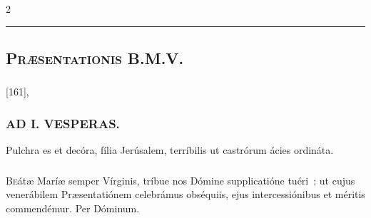 \documentclass[9pt,twoside]{extarticle}
\begin{document}
\begin{multicols}{2}
\begin{center}\textcolor{red}{\rule{\linewidth}{0.5pt}} \end{center}

\subsection*{\center \textsc{}}
\subsubsection*{\center {}}
\subsection*{\center \textsc{Præsentationis B.M.V.}}
\subsubsection*{\center {}}
\begin{tightlist}{}
\item {} [161], 
\end{tightlist}
\subsubsection*{\center \textsc{AD I. VESPERAS.}}
\begin{tightlist}{}
\item {} Pulchra es et decóra, fília Jerúsalem, terríbilis ut castrórum ácies ordináta. 
\end{tightlist}
\subsubsection*{\center {}}
\lettrine{B}eátæ Maríæ semper Vírginis, tríbue nos Dómine supplicatióne tuéri~: ut cujus venerábilem Præsentatiónem celebrámus obséquiis, ejus intercessiónibus et méritis commendémur. Per Dóminum.




\end{multicols}
\end{document}
